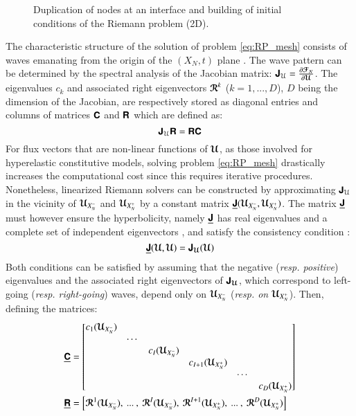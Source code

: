  
\begin{figure}[ht]
  \centering
  
  \caption{Duplication of nodes at an interface and building of initial conditions of the Riemann problem (2D).}
  \label{fig:2D_edge}
\end{figure}
The characteristic structure of the solution of problem \eqref{eq:RP_mesh} consists of waves emanating from the origin of the $(X_N,t)$ plane \cite{Courant}.
The wave pattern can be determined by the spectral analysis of the Jacobian matrix: $\boldsymbol{\mathsf{J}}_{\mathcal{U}} = \frac{\partial {\boldsymbol{\mathcal{F}}}_N}{\partial {\boldsymbol{\mathcal{U}}}}$.
The eigenvalues $c_k$ and associated right eigenvectors ${\boldsymbol{\mathcal{R}}}^k$ ($k=1, ..., D$), $D$ being the dimension of the Jacobian, are respectively stored as diagonal entries and columns of matrices $\boldsymbol{\mathsf{C}}$ and $\boldsymbol{\mathsf{R}}$ which are defined as:
\begin{equation}
  \label{eq:eigen_matrices}
  \boldsymbol{\mathsf{J}}_{\mathcal{U}} \boldsymbol{\mathsf{R}} = \boldsymbol{\mathsf{R}} \boldsymbol{\mathsf{C}}
\end{equation}
For flux vectors that are non-linear functions of ${\boldsymbol{\mathcal{U}}}$, as those involved for hyperelastic constitutive models, solving problem \eqref{eq:RP_mesh} drastically increases the computational cost since this requires iterative procedures.
Nonetheless, linearized Riemann solvers \cite{Toro} can be constructed by approximating $\boldsymbol{\mathsf{J}}_{\mathcal{U}}$ in the vicinity of ${\boldsymbol{\mathcal{U}}}_{X_N^-}$ and ${\boldsymbol{\mathcal{U}}}_{X_N^+}$ by a constant matrix $\underline{\boldsymbol{\mathsf{J}}}({\boldsymbol{\mathcal{U}}}_{X_N^-},{\boldsymbol{\mathcal{U}}}_{X_N^+})$.
The matrix $\underline{\boldsymbol{\mathsf{J}}}$ must however ensure the hyperbolicity, namely $\underline{\boldsymbol{\mathsf{J}}}$ has real eigenvalues and a complete set of independent eigenvectors \cite{Courant}, and satisfy the consistency condition \cite{Leveque}:
\begin{equation}
  \label{eq:consistency_Jacobian}
  \underline{\boldsymbol{\mathsf{J}}}({\boldsymbol{\mathcal{U}}},{\boldsymbol{\mathcal{U}}}) = \boldsymbol{\mathsf{J}}_{\boldsymbol{\mathcal{U}}}({\boldsymbol{\mathcal{U}}}) 
\end{equation}
Both conditions can be satisfied by assuming that the negative (\textit{resp. positive}) eigenvalues and the associated right eigenvectors of $\boldsymbol{\mathsf{J}}_{\boldsymbol{\mathcal{U}}}$, which correspond to left-going (\textit{resp. right-going}) waves, depend only on  ${\boldsymbol{\mathcal{U}}}_{X_N^-}$ (\textit{resp. on ${\boldsymbol{\mathcal{U}}}_{X_N^+}$}).
Then, defining the matrices:
\begin{align*}
  &\underline{\boldsymbol{\mathsf{C}}}=\left[\begin{matrix}c_1({\boldsymbol{\mathcal{U}}}_{X_N^-}) & & & & & \\ & \cdots & & && \\ & &c_I({\boldsymbol{\mathcal{U}}}_{X_N^-}) & & &\\ & & &c_{I+1}({\boldsymbol{\mathcal{U}}}_{X_N^+})& & \\ & & & &\cdots &\\ &&&&&c_D({\boldsymbol{\mathcal{U}}}_{X_N^+})\end{matrix}\right] \\
  &\underline{\boldsymbol{\mathsf{R}}} = \left[\begin{matrix}{\boldsymbol{\mathcal{R}}}^1({\boldsymbol{\mathcal{U}}}_{X_N^-}),\:  ...\:  ,\: {\boldsymbol{\mathcal{R}}}^I({\boldsymbol{\mathcal{U}}}_{X_N^-}),\: {\boldsymbol{\mathcal{R}}}^{I+1}({\boldsymbol{\mathcal{U}}}_{X_N^+}),\:...\: ,\: {\boldsymbol{\mathcal{R}}}^D({\boldsymbol{\mathcal{U}}}_{X_N^+})\end{matrix}\right] 
\end{align*}
